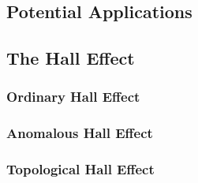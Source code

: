 \subsection{Potential Applications}\label{subsec:Applications}

\subsection{The Hall Effect}\label{subsec:HallEffect}
\subsubsection{Ordinary Hall Effect}\label{subsubsec:OHE}

\subsubsection{Anomalous Hall Effect}\label{subsubsec:AHE}

\subsubsection{Topological Hall Effect}\label{subsubsec:THE}